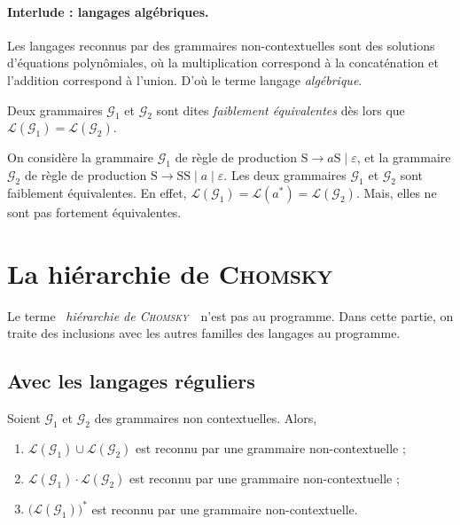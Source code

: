 \paragraph{Interlude : langages algébriques.}
Les langages reconnus par des grammaires non-contextuelles sont des solutions d'équations polynômiales, où la multiplication correspond à la concaténation et l'addition correspond à l'union.
D'où le terme langage \textit{algébrique}.

\begin{defn}
	Deux grammaires $\mathcal{G}_1$ et $\mathcal{G}_2$ sont dites \textit{faiblement équivalentes} dès lors que $\mathcal{L}(\mathcal{G}_1) = \mathcal{L}(\mathcal{G}_2)$.
\end{defn}

\begin{exm}
	On considère la grammaire $\mathcal{G}_1$ de règle de production $\mathrm{S} \to a \mathrm{S}  \mid \varepsilon$, et la grammaire $\mathcal{G}_2$ de règle de production $\mathrm{S} \to \mathrm{SS}  \mid a  \mid \varepsilon$.
	Les deux grammaires $\mathcal{G}_1$ et $\mathcal{G}_2$ sont faiblement équivalentes.
	En effet, $\mathcal{L}(\mathcal{G}_1) = \mathcal{L}(a^*) = \mathcal{L}(\mathcal{G}_2)$.
	Mais, elles ne sont pas fortement équivalentes.\footnotemark
\end{exm}

\section{La hiérarchie de \textsc{Chomsky}}

Le terme \guillemotleft~\textit{hiérarchie de \textsc{Chomsky}}~\guillemotright\ n'est pas au programme.
Dans cette partie, on traite des inclusions avec les autres familles des langages au programme.

\subsection{Avec les langages réguliers}

\begin{prop}
	Soient $\mathcal{G}_1$ et $\mathcal{G}_2$ des grammaires non contextuelles.
	Alors,
	\begin{enumerate}
		\item $\mathcal{L}(\mathcal{G}_1) \cup \mathcal{L}(\mathcal{G}_2)$ est reconnu par une grammaire non-contextuelle ;
		\item $\mathcal{L}(\mathcal{G}_1) \cdot \mathcal{L}(\mathcal{G}_2)$ est reconnu par une grammaire non-contextuelle ;
		\item $\big(\mathcal{L}(\mathcal{G}_1)\big)^*$ est reconnu par une grammaire non-contextuelle.
	\end{enumerate}
\end{prop}

